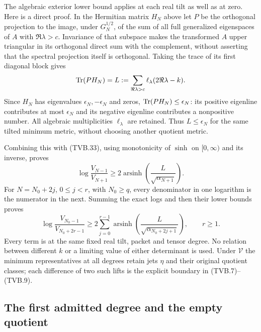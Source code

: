 The algebraic exterior lower bound applies at each real tilt as
well as at zero. Here is a direct proof. In the Hermitian matrix
$H_N$ above let $P$ be the orthogonal projection to the image,
under $G_N^{1/2}$, of the sum of all full generalized eigenspaces
of $A$ with $\Re\lambda>c$. Invariance of that subspace makes
the transformed $A$ upper triangular in its orthogonal direct sum
with the complement, without asserting that the spectral projection
itself is orthogonal. Taking the trace of its first diagonal block
gives
\[
 \operatorname{Tr}(PH_N)=
 L:=\sum_{\Re\lambda>c}\ell_\lambda(2\Re\lambda-k).
\]
Since $H_N$ has eigenvalues $\epsilon_N,-\epsilon_N$ and zeros,
$\operatorname{Tr}(PH_N)\le\epsilon_N$: its positive eigenline contributes
at most $\epsilon_N$ and its negative eigenline contributes a
nonpositive number. All algebraic multiplicities
$\ell_\lambda$ are retained. Thus $L\le\epsilon_N$ for the
same tilted minimum metric, without choosing another quotient
metric.

Combining this with (TVB.33), using monotonicity of $\sinh$ on
$[0,\infty)$ and its inverse, proves
\[
 \log\frac{V_{N-1}}{V_{N+1}}
 \ge2\operatorname{arsinh}\left(\frac{L}{\sqrt{\alpha_{N+1}}}\right).
 \tag{TVB.35}
\]
For $N=N_0+2j$, $0\le j<r$, with $N_0\ge q$, every denominator
in one logarithm is the numerator in the next. Summing the exact
logs and then their lower bounds proves
\[
 \log\frac{V_{N_0-1}}{V_{N_0+2r-1}}
 \ge2\sum_{j=0}^{r-1}
       \operatorname{arsinh}\left(
       \frac{L}{\sqrt{\alpha_{N_0+2j+1}}}\right),\qquad r\ge1.
 \tag{TVB.36}
\]
Every term is at the same fixed real tilt, packet and tensor degree.
No relation between different $k$ or a limiting value of either
determinant is used. Under $\mathcal V$ the minimum representatives
at all degrees retain jets $\eta$ and their original quotient
classes; each difference of two such lifts is the explicit boundary
in (TVB.7)--(TVB.9).

\subsection[\hspace{0.4em}The first admitted degree and the empty quotient]{The first admitted degree and the empty quotient}

